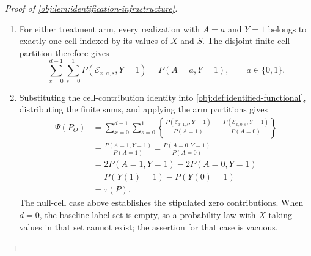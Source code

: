 \begin{proof}[Proof of \cref{obj:lem:identification-infrastructure}]
\begin{enumerate}
We identify the weighted contribution by splitting according to the cell mass. If \(P(\mathcal E_{x,a,s})=0\), nonnegativity and event inclusion imply
\[
0\le P(\mathcal E_{x,a,s},Y=1)
\le P(\mathcal E_{x,a,s})=0.
\]
Hence both the weighted observed contribution and
\(P(\mathcal E_{x,a,s},Y=1)/P(A=a)\) are zero.

If \(P(\mathcal E_{x,a,s})>0\), event inclusion gives
\[
0<P(\mathcal E_{x,a,s})\le P(A=a).
\]
The arrival floor in \cref{obj:ass:arrival-floor} and the stipulated range of \(q\) give
\[
\frac{P(\mathcal E_{x,a,s},R=1)}
     {P(\mathcal E_{x,a,s})}
\ge q\ge\frac12>0,
\qquad
P(\mathcal E_{x,a,s},R=1)>0.
\]
Conditional independence in \cref{obj:ass:mar}, applied to \(R=1\) and \(Y=1\), gives the cross-product identity
\[
P(\mathcal E_{x,a,s},R=1,Y=1)\,
P(\mathcal E_{x,a,s})
=
P(\mathcal E_{x,a,s},R=1)\,
P(\mathcal E_{x,a,s},Y=1).
\]
Dividing by the two positive cell masses yields
\[
\mu_P(x,a,s)
=
\frac{P(\mathcal E_{x,a,s},R=1,Y=1)}
     {P(\mathcal E_{x,a,s},R=1)}
=
\frac{P(\mathcal E_{x,a,s},Y=1)}
     {P(\mathcal E_{x,a,s})}.
\]
Multiplication by the cell weight now proves, in both cases,
\[
\frac{P_O(\mathcal E_{x,a,s})}{P_O(A=a)}
\,\mu_P(x,a,s)
=
\frac{P(\mathcal E_{x,a,s},Y=1)}{P(A=a)}.
\]

\item For either treatment arm, every realization with \(A=a\) and \(Y=1\) belongs to exactly one cell indexed by its values of \(X\) and \(S\). The disjoint finite-cell partition therefore gives
\[
\sum_{x=0}^{d-1}\sum_{s=0}^{1}
P(\mathcal E_{x,a,s},Y=1)
=
P(A=a,Y=1),
\qquad a\in\{0,1\}.
\]

\item Substituting the cell-contribution identity into
\cref{obj:def:identified-functional}, distributing the finite sums, and applying the arm partitions gives
\[
\begin{aligned}
\Psi(P_O)
&=\sum_{x=0}^{d-1}\sum_{s=0}^{1}
\left\{
\frac{P(\mathcal E_{x,1,s},Y=1)}{P(A=1)}
-
\frac{P(\mathcal E_{x,0,s},Y=1)}{P(A=0)}
\right\}\\
&=\frac{P(A=1,Y=1)}{P(A=1)}
  -\frac{P(A=0,Y=1)}{P(A=0)}\\
&=2P(A=1,Y=1)-2P(A=0,Y=1)\\
&=P(Y(1)=1)-P(Y(0)=1)\\
&=\tau(P).
\end{aligned}
\]
The null-cell case above establishes the stipulated zero contributions. When \(d=0\), the baseline-label set is empty, so a probability law with \(X\) taking values in that set cannot exist; the assertion for that case is vacuous.
\end{enumerate}
\end{proof}
